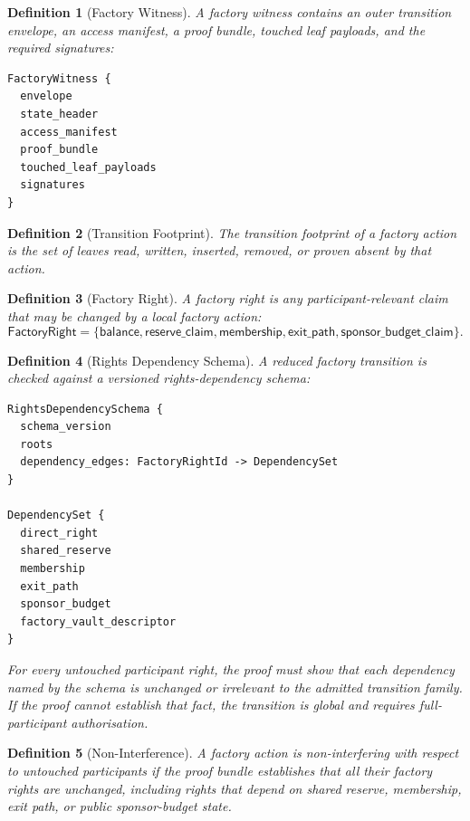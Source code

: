 \documentclass[a4paper,11pt]{article}
\newtheorem{definition}{Definition}
\begin{document}
\begin{definition}[Factory Witness]
A factory witness contains an outer transition envelope, an access manifest, a proof bundle, touched leaf payloads, and the required signatures:
\begin{lstlisting}
FactoryWitness {
  envelope
  state_header
  access_manifest
  proof_bundle
  touched_leaf_payloads
  signatures
}
\end{lstlisting}
\end{definition}

\begin{definition}[Transition Footprint]
The transition footprint of a factory action is the set of leaves read, written, inserted, removed, or proven absent by that action.
\end{definition}

\begin{definition}[Factory Right]
A factory right is any participant-relevant claim that may be changed by a local factory action:
\[
\mathsf{FactoryRight} =
\{\mathsf{balance},\mathsf{reserve\_claim},\mathsf{membership},
\mathsf{exit\_path},\mathsf{sponsor\_budget\_claim}\}.
\]
\end{definition}

\begin{definition}[Rights Dependency Schema]
A reduced factory transition is checked against a versioned rights-dependency
schema:
\begin{lstlisting}
RightsDependencySchema {
  schema_version
  roots
  dependency_edges: FactoryRightId -> DependencySet
}

DependencySet {
  direct_right
  shared_reserve
  membership
  exit_path
  sponsor_budget
  factory_vault_descriptor
}
\end{lstlisting}
For every untouched participant right, the proof must show that each dependency
named by the schema is unchanged or irrelevant to the admitted transition
family. If the proof cannot establish that fact, the transition is global and
requires full-participant authorisation.
\end{definition}

\begin{definition}[Non-Interference]
A factory action is non-interfering with respect to untouched participants if the proof bundle establishes that all their factory rights are unchanged, including rights that depend on shared reserve, membership, exit path, or public sponsor-budget state.
\end{definition}
\end{document}
